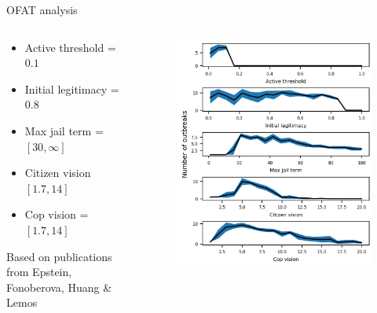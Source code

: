 \documentclass[10pt]{beamer}
\begin{document}
    \begin{frame}{OFAT analysis}

        \begin{columns}
            \begin{column}{0.4\textwidth}
                \begin{itemize}
                    \item Active threshold =  $0.1$
                    \item Initial legitimacy =  $0.8$
                    \item Max jail term = $[30, \infty]$
                    \item Citizen vision  $[1.7,  14]$
                    \item Cop vision = $[1.7, 14]$
                \end{itemize}

                Based on publications from Epstein, Fonoberova, Huang \& Lemos
            \end{column}

            \begin{column}{0.6\textwidth}
                \begin{figure}
                    \centering
                    \includegraphics[width=.8\textwidth]{pictures/sensitivity_analysis/ofat-outbreaks.jpg}
                \end{figure}
            \end{column}
        \end{columns}

    \end{frame}
\end{document}

